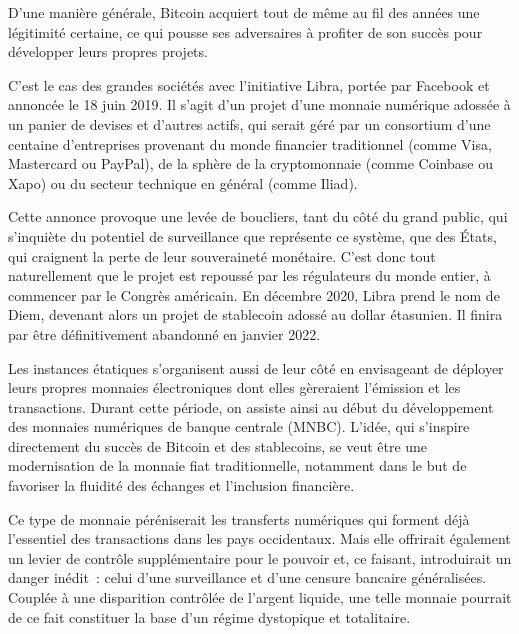 D'une manière générale, Bitcoin acquiert tout de même au fil des années une légitimité certaine, ce qui pousse ses adversaires à profiter de son succès pour développer leurs propres projets.

C'est le cas des grandes sociétés avec l'initiative Libra, portée par Facebook et annoncée le 18 juin 2019. Il s'agit d'un projet d'une monnaie numérique adossée à un panier de devises et d'autres actifs, qui serait géré par un consortium d'une centaine d'entreprises provenant du monde financier traditionnel (comme Visa, Mastercard ou PayPal), de la sphère de la cryptomonnaie (comme Coinbase ou Xapo) ou du secteur technique en général (comme Iliad). %

Cette annonce provoque une levée de boucliers, tant du côté du grand public, qui s'inquiète du potentiel de surveillance que représente ce système, que des États, qui craignent la perte de leur souveraineté monétaire. C'est donc tout naturellement que le projet est repoussé par les régulateurs du monde entier, à commencer par le Congrès américain. En décembre 2020, Libra prend le nom de Diem, devenant alors un projet de stablecoin adossé au dollar étasunien. Il finira par être définitivement abandonné en janvier 2022.

Les instances étatiques s'organisent aussi de leur côté en envisageant de déployer leurs propres monnaies électroniques dont elles gèreraient l'émission et les transactions. Durant cette période, on assiste ainsi au début du développement des monnaies numériques de banque centrale (MNBC). L'idée, qui s'inspire directement du succès de Bitcoin et des stablecoins, se veut être une modernisation de la monnaie fiat traditionnelle, notamment dans le but de favoriser la fluidité des échanges et l'inclusion financière.

Ce type de monnaie péréniserait les transferts numériques qui forment déjà l'essentiel des transactions dans les pays occidentaux. Mais elle offrirait également un levier de contrôle supplémentaire pour le pouvoir et, ce faisant, introduirait un danger inédit~: celui d'une surveillance et d'une censure bancaire généralisées. Couplée à une disparition contrôlée de l'argent liquide, une telle monnaie pourrait de ce fait constituer la base d'un régime dystopique et totalitaire.

